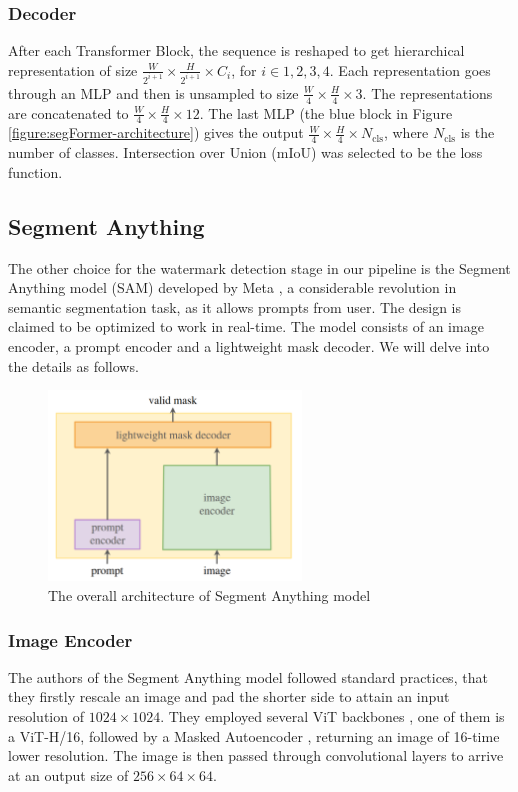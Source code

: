 \subsubsection{Decoder}
After each Transformer Block, the sequence is reshaped to get hierarchical representation of size $\frac{W}{2^{i+1}}\times \frac{H}{2^{i+1}}\times C_i$, for $i\in{1,2,3,4}$. Each representation goes through an MLP and then is unsampled to size $\frac{W}{4}\times \frac{H}{4}\times 3$. The representations are concatenated to $\frac{W}{4}\times \frac{H}{4}\times 12$. The last MLP (the blue block in Figure \ref{figure:segFormer-architecture}) gives the output $\frac{W}{4}\times \frac{H}{4}\times N_{\mathrm{cls}}$, where $N_{\mathrm{cls}}$ is the number of classes. Intersection over Union (mIoU) was selected to be the loss function.

\subsection{Segment Anything}
\label{sec:intro-sam}
The other choice for the watermark detection stage in our pipeline is the Segment Anything model (SAM) developed by Meta \cite{kirillov2023segment}, a considerable revolution in semantic segmentation task, as it allows prompts from user. The design is claimed to be optimized to work in real-time. The model consists of an image encoder, a prompt encoder and a lightweight mask decoder. We will delve into the details as follows.

\begin{figure}
  \centering
  \includegraphics[width=0.6\textwidth]{img/segment-anything-model.png}
  \vspace{0.25cm}
  \caption[The overall architecture of Segment Anything model]{The overall architecture of Segment Anything model \cite{kirillov2023segment}}
\end{figure}

\subsubsection{Image Encoder}
The authors of the Segment Anything model followed standard practices, that they firstly rescale an image and pad the shorter side to attain an input resolution of $1024\times1024$. They employed several ViT backbones \cite{dosovitskiy2020image}, one of them is a ViT-H/16, followed by a Masked Autoencoder \cite{he2022masked}, returning an image of 16-time lower resolution.   The image is then passed through convolutional layers to arrive at an output size of $256\times 64\times 64$.

